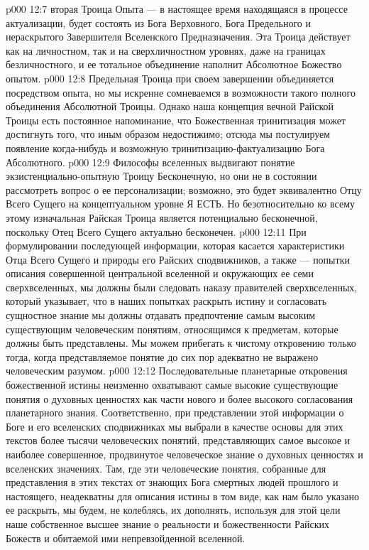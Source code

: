 \vs p000 12:7 \bibnobreakspace {} вторая Троица Опыта --- в настоящее время находящаяся в процессе актуализации, будет состоять из Бога Верховного, Бога Предельного и нераскрытого Завершителя Вселенского Предназначения. Эта Троица действует как на личностном, так и на сверхличностном уровнях, даже на границах безличностного, и ее тотальное объединение наполнит Абсолютное Божество опытом.
\vs p000 12:8 \pc Предельная Троица при своем завершении объединяется посредством опыта, но мы искренне сомневаемся в возможности такого полного объединения Абсолютной Троицы. Однако наша концепция вечной Райской Троицы есть постоянное напоминание, что Божественная тринитизация может достигнуть того, что иным образом недостижимо; отсюда мы постулируем появление когда\hyp{}нибудь  и возможную тринитизацию\hyp{}фактуализацию Бога Абсолютного.
\vs p000 12:9 \pc Философы вселенных выдвигают понятие  экзистенциально\hyp{}опытную Троицу Бесконечную, но они не в состоянии рассмотреть вопрос о ее персонализации; возможно, это будет эквивалентно Отцу Всего Сущего на концептуальном уровне Я ЕСТЬ. Но безотносительно ко всему этому изначальная Райская Троица является потенциально бесконечной, поскольку Отец Всего Сущего актуально бесконечен.
\vs p000 12:11 При формулировании последующей информации, которая касается характеристики Отца Всего Сущего и природы его Райских сподвижников, а также --- попытки описания совершенной центральной вселенной и окружающих ее семи сверхвселенных, мы должны были следовать наказу правителей сверхвселенных, который указывает, что в наших попытках раскрыть истину и согласовать сущностное знание мы должны отдавать предпочтение самым высоким существующим человеческим понятиям, относящимся к предметам, которые должны быть представлены. Мы можем прибегать к чистому откровению только тогда, когда представляемое понятие до сих пор адекватно не выражено человеческим разумом.
\vs p000 12:12 Последовательные планетарные откровения божественной истины неизменно охватывают самые высокие существующие понятия о духовных ценностях как части нового и более высокого согласования планетарного знания. Соответственно, при представлении этой информации о Боге и его вселенских сподвижниках мы выбрали в качестве основы для этих текстов более тысячи человеческих понятий, представляющих самое высокое и наиболее совершенное, продвинутое человеческое знание о духовных ценностях и вселенских значениях. Там, где эти человеческие понятия, собранные для представления в этих текстах от знающих Бога смертных людей прошлого и настоящего, неадекватны для описания истины в том виде, как нам было указано ее раскрыть, мы будем, не колеблясь, их дополнять, используя для этой цели наше собственное высшее знание о реальности и божественности Райских Божеств и обитаемой ими непревзойденной вселенной.
